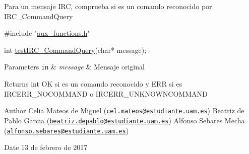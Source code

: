 Para un mensaje I\-R\-C, comprueba si es un comando reconocido por I\-R\-C\-\_\-\-Command\-Query


\begin{DoxyCode}
\textcolor{preprocessor}{#include "\hyperlink{aux__functions_8h}{aux\_functions.h}"}

\textcolor{keywordtype}{int} \hyperlink{aux__functions_8h_a8d3c58618c3bb95d81a542251062d19e}{testIRC\_CommandQuery}(\textcolor{keywordtype}{char}* message);
\end{DoxyCode}



\begin{DoxyParams}[1]{Parameters}
\mbox{\tt in}  & {\em message} & Mensaje original\\
\hline
\end{DoxyParams}
\begin{DoxyReturn}{Returns}
int O\-K si es un comando reconocido y E\-R\-R si es I\-R\-C\-E\-R\-R\-\_\-\-N\-O\-C\-O\-M\-M\-A\-N\-D o I\-R\-C\-E\-R\-R\-\_\-\-U\-N\-K\-N\-O\-W\-N\-C\-O\-M\-M\-A\-N\-D 
\end{DoxyReturn}
\begin{DoxyAuthor}{Author}
Celia Mateos de Miguel (\href{mailto:cel.mateos@estudiante.uam.es}{\tt cel.\-mateos@estudiante.\-uam.\-es}) Beatriz de Pablo Garcia (\href{mailto:beatriz.depablo@estudiante.uam.es}{\tt beatriz.\-depablo@estudiante.\-uam.\-es}) Alfonso Sebares Mecha (\href{mailto:alfonso.sebares@estudiante.uam.es}{\tt alfonso.\-sebares@estudiante.\-uam.\-es})
\end{DoxyAuthor}
\begin{DoxyDate}{Date}
13 de febrero de 2017
\end{DoxyDate}


 